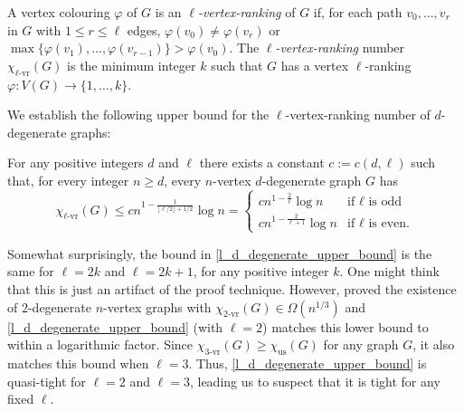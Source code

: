 \documentclass{patmorin}
\newcommand{\defin}[1]{\emph{\color{brightmaroon}#1}}
\newcommand{\rn}[1]{\chi_{\operatorname{#1-vr}}}
\newcommand{\trn}{\chi_{\mathrm{us}}}
\newcommand{\lrn}{\rn{\ell}}
\newcommand{\dexp}{1-\frac{1}{\lfloor\ell/2\rfloor+1/2}}
\begin{document}

A vertex colouring $\varphi$ of $G$ is an \defin{$\ell$-vertex-ranking} of $G$ if, for each path $v_0,\ldots,v_r$ in $G$ with $1\le r\le\ell$ edges, $\varphi(v_0)\neq \varphi(v_r)$ or $\max\{\varphi(v_1),\ldots,\varphi(v_{r-1})\}>\varphi(v_0)$.  The \defin{$\ell$-vertex-ranking} number $\lrn(G)$ is the minimum integer $k$ such that $G$ has a vertex $\ell$-ranking $\varphi:V(G)\to\{1,\ldots,k\}$.


We establish the following upper bound for the $\ell$-vertex-ranking number of $d$-degenerate graphs:

\begin{thm}\label{l_d_degenerate_upper_bound}
  For any positive integers $d$ and $\ell$ there exists a constant $c:=c(d,\ell)$ such that, for every integer $n\ge d$, every $n$-vertex $d$-degenerate graph $G$ has
  \[
    \lrn(G)\le c n^{\dexp}\log n
    = \begin{cases}
      cn^{1-\frac{2}{\ell}}\log n & \text{if $\ell$ is odd} \\
      cn^{1-\frac{2}{\ell+1}}\log n & \text{if $\ell$ is even.}
      \end{cases}
  \]
\end{thm}
Somewhat surprisingly, the bound in \cref{l_d_degenerate_upper_bound} is the same for $\ell=2k$ and $\ell=2k+1$, for any positive integer $k$.  One might think that this is just an artifact of the proof technique.  However, \citet{karpas.neiman.ea:on} proved the existence of $2$-degenerate $n$-vertex graphs with $\rn{2}(G)\in\Omega(n^{1/3})$ and \cref{l_d_degenerate_upper_bound} (with $\ell=2$) matches this lower bound to within a logarithmic factor.  Since $\rn{3}(G)\ge\trn(G)$ for any graph $G$, it also matches this bound when $\ell=3$.  Thus, \cref{l_d_degenerate_upper_bound} is quasi-tight for $\ell=2$ and $\ell=3$, leading us to suspect that it is tight for any fixed $\ell$.
\end{document}
